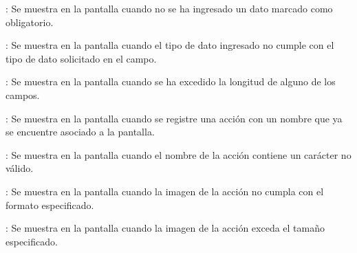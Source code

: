 \begin{Citemize}
	\item {}: Se muestra en la pantalla  cuando no se ha ingresado un dato marcado como obligatorio.
	\item {}: Se muestra en la pantalla  cuando el tipo de dato ingresado no cumple con el tipo de dato solicitado en el campo.
	\item {}: Se muestra en la pantalla  cuando se ha excedido la longitud de alguno de los campos.
	\item {}: Se muestra en la pantalla  cuando se registre una acción con un nombre que ya se encuentre asociado a la pantalla.
	\item {}: Se muestra en la pantalla  cuando el nombre de la acción contiene un carácter no válido.
	\item {}: Se muestra en la pantalla  cuando la imagen de la acción no cumpla con el formato especificado.
	\item {}: Se muestra en la pantalla  cuando la imagen de la acción exceda el tamaño especificado.
\end{Citemize}
